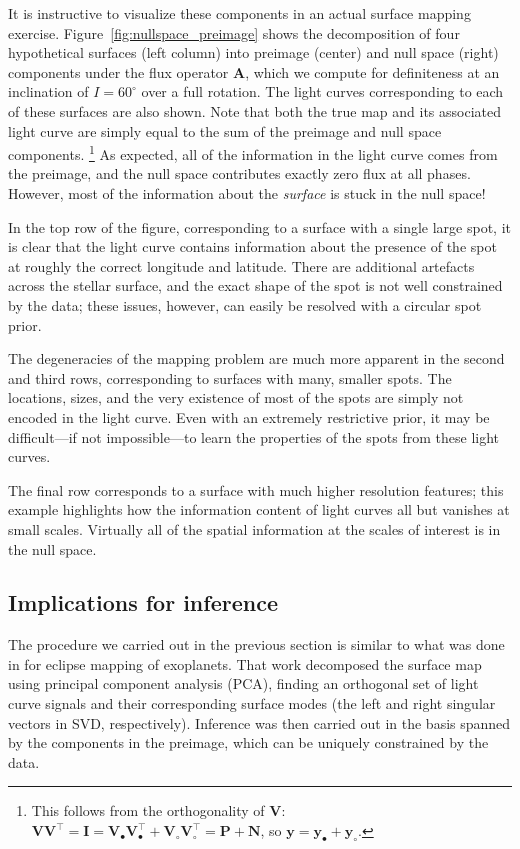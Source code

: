 \documentclass[modern]{aastex62}
\begin{document}
It is instructive to visualize these components in
an actual surface mapping exercise. Figure~\ref{fig:nullspace_preimage}
shows the decomposition of four hypothetical surfaces (left
column) into preimage (center) and null space (right)
components under the flux operator $\mathbf{A}$, which we compute for
definiteness at an inclination of $I = 60^\circ$ over a full rotation.
The light curves corresponding to each of these surfaces are also shown.
Note that both the true map and its associated light curve are simply equal to
the sum of the preimage and null space components.%
\footnote{%
    This follows from the orthogonality of $\mathbf{V}$:
    $
        \mathbf{V} \mathbf{V}^\top =
        \mathbf{I} =
        \mathbf{V}_\bullet \mathbf{V}_\bullet^\top  + \mathbf{V}_\circ \mathbf{V}_\circ^\top =
        \mathbf{P} + \mathbf{N}
    $, so $\mathbf{y} = \mathbf{y}_\bullet + \mathbf{y}_\circ$.
}
%
As expected, all of the information in the light curve comes
from the preimage, and the null space contributes exactly zero
flux at all phases. However, most of the information about the
\emph{surface} is stuck in the null space!

In the top row of the figure, corresponding to a surface with
a single large spot, it is clear that the light curve
contains information about the presence of the spot at roughly the
correct longitude and latitude. There are additional artefacts
across the stellar surface, and the exact shape of the spot is
not well constrained by the data; these issues, however, can
easily be resolved with a circular spot prior.

The degeneracies of the mapping problem are much more apparent
in the second and third rows, corresponding to surfaces with
many, smaller spots. The locations, sizes, and the very existence
of most of the spots are simply not encoded in the light curve.
Even with an extremely restrictive prior, it may be difficult---if
not impossible---to learn the properties of the spots
from these light curves.

The final row corresponds to a surface with much higher resolution
features; this example highlights how the information content of
light curves all but vanishes at small scales. Virtually all of the
spatial information at the scales of interest is in the null space.

\subsection{Implications for inference}
%
The procedure we carried out in the previous section is similar to what was done in \citet{Rauscher2018}
for eclipse mapping of exoplanets. That work decomposed the surface map
using principal component analysis (PCA), finding an orthogonal set of
light curve signals and their corresponding surface modes (the left and right
singular vectors in SVD, respectively). Inference was then carried out in
the basis spanned by the components in the preimage, which can be uniquely
constrained by the data.
\end{document}
